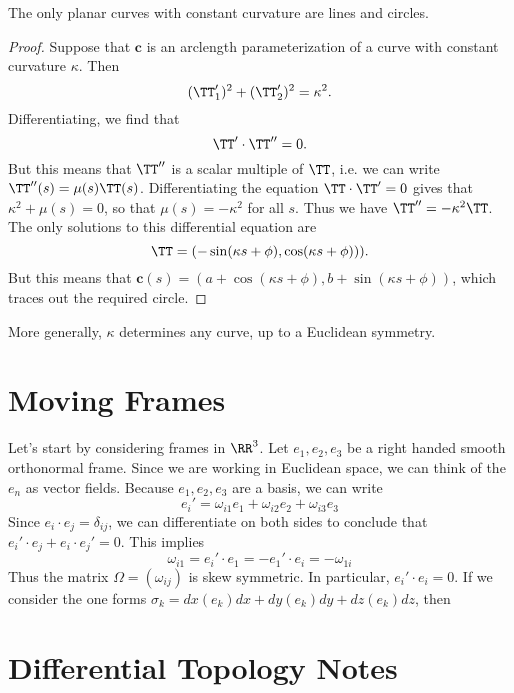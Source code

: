 \begin{theorem}
    The only planar curves with constant curvature are lines and circles.
\end{theorem}
\begin{proof}
    Suppose that $\mathbf{c}$ is an arclength parameterization of a curve with constant curvature $\kappa$. Then
    \[ (\TT_1')^2 + (\TT_2')^2 = \kappa^2. \]
    Differentiating, we find that
    \[ \TT' \cdot \TT'' = 0. \]
    But this means that $\TT''$ is a scalar multiple of $\TT$, i.e. we can write $\TT''(s) = \mu(s) \TT(s)$. Differentiating the equation $\TT \cdot \TT' = 0$ gives that $\kappa^2 + \mu(s) = 0$, so that $\mu(s) = -\kappa^2$ for all $s$. Thus we have $\TT'' = - \kappa^2 \TT$. The only solutions to this differential equation are
    \[ \TT = (- \sin( \kappa s + \phi), \cos(\kappa s + \phi))). \]
    But this means that $\mathbf{c}(s) = (a + \cos(\kappa s + \phi), b + \sin(\kappa s + \phi))$, which traces out the required circle.
\end{proof}

More generally, $\kappa$ determines any curve, up to a Euclidean symmetry.



\chapter{Moving Frames}

Let's start by considering frames in $\RR^3$. Let $e_1, e_2, e_3$ be a right handed smooth orthonormal frame. Since we are working in Euclidean space, we can think of the $e_n$ as vector fields. Because $e_1, e_2, e_3$ are a basis, we can write
%
\[ e_i' = \omega_{i1} e_1 + \omega_{i2} e_2 + \omega_{i3} e_3 \]
%
Since $e_i \cdot e_j = \delta_{ij}$, we can differentiate on both sides to conclude that $e_i' \cdot e_j + e_i \cdot e_j' = 0$. This implies
%
\[ \omega_{i1} = e_i' \cdot e_1 = - e_1' \cdot e_i = - \omega_{1i} \]
%
Thus the matrix $\Omega = (\omega_{ij})$ is skew symmetric. In particular, $e_i' \cdot e_i = 0$. If we consider the one forms $\sigma_k = dx(e_k) dx + dy(e_k) dy + dz(e_k) dz$, then











\chapter{Differential Topology Notes}

